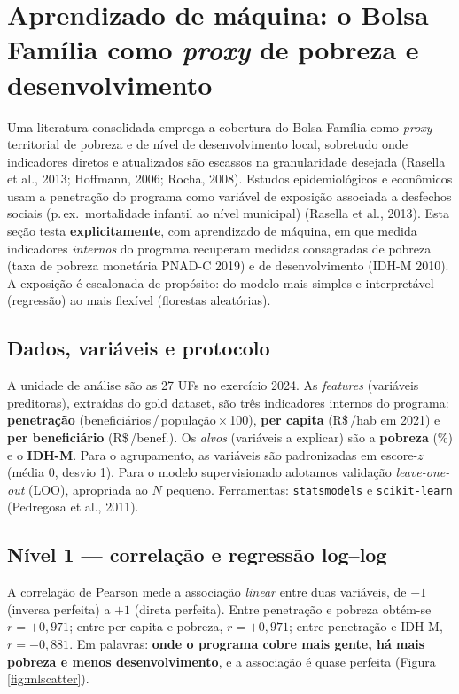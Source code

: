 \documentclass[12pt,a4paper,oneside]{article}
\newcommand{\rs}{R\$\,}
\begin{document}
\section{Aprendizado de máquina: o Bolsa Família como \textit{proxy} de pobreza e desenvolvimento}\label{sec:ml}


Uma literatura consolidada emprega a cobertura do Bolsa Família como
\textit{proxy} territorial de pobreza e de nível de desenvolvimento
local, sobretudo onde indicadores diretos e atualizados são escassos na
granularidade desejada (Rasella et al., 2013; Hoffmann, 2006; Rocha, 2008). Estudos epidemiológicos e econômicos usam a penetração
do programa como variável de exposição associada a desfechos sociais
(p.\,ex.\ mortalidade infantil ao nível municipal) (Rasella et al., 2013).
Esta seção testa \textbf{explicitamente}, com aprendizado de máquina, em
que medida indicadores \textit{internos} do programa recuperam medidas
consagradas de pobreza (taxa de pobreza monetária PNAD-C 2019) e de
desenvolvimento (IDH-M 2010). A exposição é escalonada de propósito: do
modelo mais simples e interpretável (regressão) ao mais flexível
(florestas aleatórias).

\subsection{Dados, variáveis e protocolo}

A unidade de análise são as 27 UFs no exercício 2024. As
\textit{features} (variáveis preditoras), extraídas do gold dataset, são
três indicadores internos do programa: \textbf{penetração}
(beneficiários\,/\,população\,$\times$\,100), \textbf{per capita}
(\rs/hab em 2021) e \textbf{per beneficiário} (\rs/benef.). Os
\textit{alvos} (variáveis a explicar) são a \textbf{pobreza} (\%) e o
\textbf{IDH-M}. Para o agrupamento, as variáveis são padronizadas em
escore-$z$ (média 0, desvio 1). Para o modelo supervisionado adotamos
validação \textit{leave-one-out} (LOO), apropriada ao $N$ pequeno.
Ferramentas: \texttt{statsmodels} e \texttt{scikit-learn} (Pedregosa et al., 2011).

\subsection{Nível 1 --- correlação e regressão log--log}

A correlação de Pearson mede a associação \textit{linear} entre duas
variáveis, de $-1$ (inversa perfeita) a $+1$ (direta perfeita). Entre
penetração e pobreza obtém-se $r = +0{,}971$; entre per capita e
pobreza, $r = +0{,}971$; entre penetração e IDH-M, $r = -0{,}881$. Em
palavras: \textbf{onde o programa cobre mais gente, há mais pobreza e
menos desenvolvimento}, e a associação é quase perfeita
(Figura \ref{fig:mlscatter}).
\end{document}
